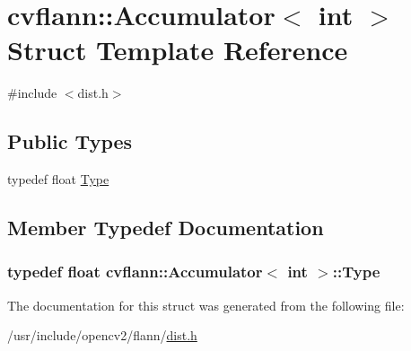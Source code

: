 \hypertarget{structcvflann_1_1Accumulator_3_01int_01_4}{\section{cvflann\-:\-:Accumulator$<$ int $>$ Struct Template Reference}
\label{structcvflann_1_1Accumulator_3_01int_01_4}
}


{\ttfamily \#include $<$dist.\-h$>$}

\subsection*{Public Types}
\begin{DoxyCompactItemize}
\item 
typedef float \hyperlink{structcvflann_1_1Accumulator_3_01int_01_4_a0e6bee3064a33d6b39cf014282ba3e8e}{Type}
\end{DoxyCompactItemize}


\subsection{Member Typedef Documentation}
\hypertarget{structcvflann_1_1Accumulator_3_01int_01_4_a0e6bee3064a33d6b39cf014282ba3e8e}{
\subsubsection[{Type}]{\setlength{\rightskip}{0pt plus 5cm}typedef float {\bf cvflann\-::\-Accumulator}$<$ int $>$\-::{\bf Type}}}\label{structcvflann_1_1Accumulator_3_01int_01_4_a0e6bee3064a33d6b39cf014282ba3e8e}


The documentation for this struct was generated from the following file\-:\begin{DoxyCompactItemize}
\item 
/usr/include/opencv2/flann/\hyperlink{dist_8h}{dist.\-h}\end{DoxyCompactItemize}
